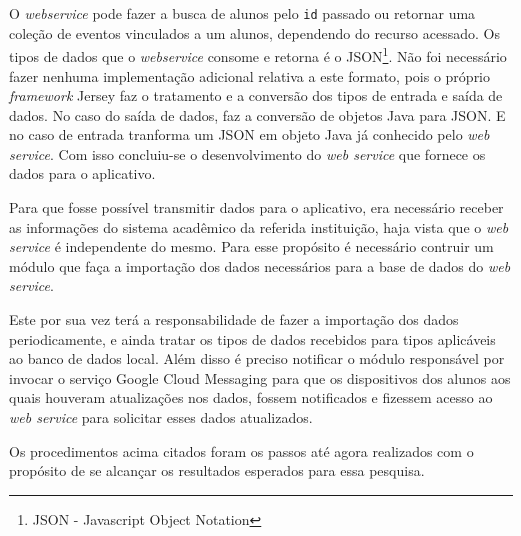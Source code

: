 		\par O \textit{webservice} pode fazer a busca de alunos pelo \texttt{id}
passado ou retornar uma coleção de eventos vinculados a um alunos, dependendo
do recurso acessado. Os tipos de dados que o \textit{webservice} consome e
retorna é o JSON\footnote{JSON - Javascript Object Notation}. Não foi
necessário fazer nenhuma implementação adicional relativa a este formato, pois
o próprio \textit{framework} Jersey faz o tratamento e a conversão dos tipos de
entrada e saída de dados. No caso do saída de dados, faz a conversão de objetos 
Java para JSON. E no caso de entrada tranforma um JSON em objeto
Java já conhecido pelo \textit{web service}. Com isso concluiu-se o
desenvolvimento do \textit{web service} que fornece os dados para o aplicativo.

	\par Para que fosse possível transmitir dados para o aplicativo, era
necessário receber as informações do sistema acadêmico da referida instituição,
haja vista que o \textit{web service} é independente do mesmo. Para esse
propósito é necessário  contruir um módulo que faça a importação dos dados
necessários para a base de dados do \textit{web service}. 

	\par Este por sua vez terá a responsabilidade de fazer a importação dos dados
periodicamente, e ainda tratar os tipos de dados recebidos para tipos
aplicáveis ao banco de dados local. Além disso é preciso notificar o módulo
responsável por invocar o serviço Google Cloud Messaging para que os
dispositivos dos alunos aos quais houveram atualizações nos dados, fossem
notificados e fizessem acesso ao \textit{web service} para solicitar esses
dados atualizados.

	\par Os procedimentos acima citados foram os passos até agora realizados com o
propósito de se alcançar os resultados esperados para essa pesquisa.



